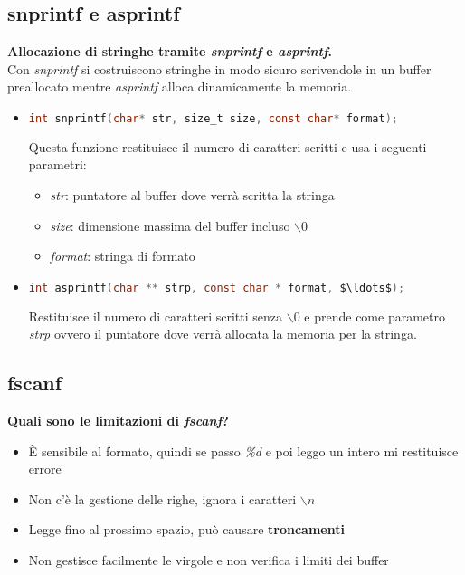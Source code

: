 \subsection{snprintf e asprintf}
\textbf{Allocazione di stringhe tramite \textit{snprintf} e \textit{asprintf}.}\\
Con \textit{snprintf} si costruiscono stringhe in modo sicuro scrivendole in un buffer preallocato mentre \textit{asprintf} alloca dinamicamente la memoria.
\begin{itemize}
	\item \begin{lstlisting}[language=C]
		int snprintf(char* str, size_t size, const char* format);
	\end{lstlisting}
	Questa funzione restituisce il numero di caratteri scritti e usa i seguenti parametri:
	\begin{itemize}
		\item \textit{str}: puntatore al buffer dove verrà scritta la stringa
		\item \textit{size}: dimensione massima del buffer incluso \textit{$\backslash 0$}
		\item \textit{format}: stringa di formato
	\end{itemize}
	\item \begin{lstlisting}[language=C, mathescape]
		int asprintf(char ** strp, const char * format, $\ldots$);
	\end{lstlisting}
	Restituisce il numero di caratteri scritti senza $\backslash 0$ e prende come parametro \textit{strp} ovvero il puntatore dove verrà allocata la memoria per la stringa.
\end{itemize}
\subsection{fscanf}
\textbf{Quali sono le limitazioni di \textit{fscanf}?}\\
\begin{itemize}
	\item È sensibile al formato, quindi se passo \textit{\%d} e poi leggo un intero mi restituisce errore
	\item Non c'è la gestione delle righe, ignora i caratteri \textit{$\backslash n$}
	\item Legge fino al prossimo spazio, può causare \textbf{troncamenti}
	\item Non gestisce facilmente le virgole e non verifica i limiti dei buffer
\end{itemize}
